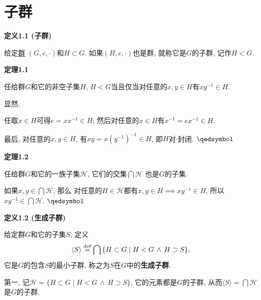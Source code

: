 \documentclass[UTF8]{ctexart}
\begin{document}
\setlength{\abovedisplayskip}{1pt}
\setlength{\belowdisplayskip}{1pt}

\section{子群}

\hypertarget{sec:定义1.1}{}
\noindent\textbf{定义1.1 (子群)}

给定\href{01 半群与群#nameddest=sec:定义2.1}{群} $(G,e,\cdot)$和$H\subset G$.
如果$(H,e,\cdot)$也是群, 就称它是$G$的子群, 记作$H<G$.

\vspace{10pt}

\hypertarget{sec:定理1.1}{}
\noindent\textbf{定理1.1}

任给群$G$和它的非空子集$H$, $H<G$当且仅当对任意的$x,y\in H$有$xy^{-1}\in H$.


 显然.


任取$x\in H$可得$e=xx^{-1}\in H$; 然后对任意的$x\in H$有$x^{-1}=ex^{-1}\in H$.

最后, 对任意的$x,y\in H$, 有$xy=x(y^{-1})^{-1}\in H$, 即$H$对$\cdot$封闭.
\hfill $\qedsymbol$

\vspace{10pt}

\hypertarget{sec:定理1.2}{}
\noindent\textbf{定理1.2}

任给群$G$和它的一族子集$\mathcal{H}$, 它们的交集$\displaystyle\bigcap\mathcal{H}$
也是$G$的子集.


如果$\displaystyle x,y\in\bigcap\mathcal{H}$, 那么
对任意的$H\in\mathcal{H}$都有$x,y\in H\implies xy^{-1}\in H$,
所以$\displaystyle xy^{-1}\in\bigcap\mathcal{H}$. \hfill $\qedsymbol$

\vspace{10pt}

\hypertarget{sec:定义1.2}{}
\noindent\textbf{定义1.2 (生成子群)}

给定群$G$和它的子集$S$, 定义
\[
    \langle S\rangle\overset{\mathrm{def}}{=}
    \bigcap\,\{H\subset G\mid H<G\,\land\,H\supset S\},\\[1pt]
\]
它是$G$的包含$S$的最小子群, 称之为$S$在$G$中的\textbf{生成子群}.


第一, 记$\mathcal{H}=\{H\subset G\mid H<G\,\land\,H\supset S\}$,
它的元素都是$G$的子群,
从而$\displaystyle\langle S\rangle=\bigcap\mathcal{H}$是$G$的子群.
\end{document}
